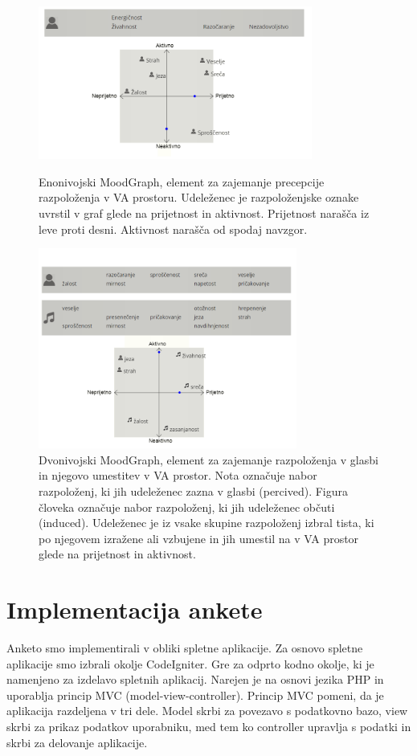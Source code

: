 \documentclass[a4paper, 12pt]{book}
\begin{document}
{\begin{figure}[h!bt]
\centering
\includegraphics[width=9cm]{images/enomoodgraph.png}

\caption{Enonivojski MoodGraph, element za zajemanje precepcije razpoloženja v VA prostoru. Udeleženec je razpoloženjske oznake uvrstil v graf glede na prijetnost in aktivnost. Prijetnost narašča iz leve proti desni. Aktivnost narašča od spodaj navzgor. }
\label{moodgraph}

\centering
\includegraphics[width=8.5cm]{images/moodgraphdvo1.png}

\caption{Dvonivojski MoodGraph, element za zajemanje razpoloženja v glasbi in njegovo umestitev v VA prostor. Nota označuje nabor razpoloženj, ki jih udeleženec zazna v glasbi (percived). Figura človeka označuje nabor razpoloženj, ki jih udeleženec občuti (induced). Udeleženec je iz vsake skupine razpoloženj izbral tista, ki po njegovem izražene ali vzbujene in jih umestil na v VA prostor glede na prijetnost in aktivnost.}
\label{moodgraphdvo}


\end{figure}


\section{Implementacija ankete}

Anketo smo implementirali v obliki spletne aplikacije. Za osnovo spletne aplikacije smo izbrali okolje CodeIgniter. Gre za odprto kodno okolje, ki je namenjeno za izdelavo spletnih aplikacij. Narejen je na osnovi jezika PHP in uporablja princip MVC (model-view-controller). Princip MVC pomeni, da je aplikacija razdeljena v tri dele. Model skrbi za povezavo s podatkovno bazo, view skrbi za prikaz podatkov uporabniku, med tem ko controller upravlja s podatki in skrbi za delovanje aplikacije.

}
\end{document}
